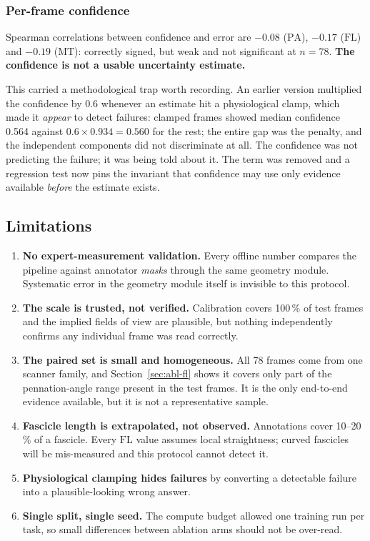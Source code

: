 \documentclass[11pt,a4paper]{article}
\newcommand{\MT}{\ensuremath{\mathrm{MT}}}
\newcommand{\PA}{\ensuremath{\mathrm{PA}}}
\newcommand{\FL}{\ensuremath{\mathrm{FL}}}
\begin{document}
\subsubsection{Per-frame confidence}

Spearman correlations between confidence and error are $-0.08$ (\PA), $-0.17$
(\FL) and $-0.19$ (\MT): correctly signed, but weak and not significant at
$n=78$. \textbf{The confidence is not a usable uncertainty estimate.}

This carried a methodological trap worth recording. An earlier version multiplied
the confidence by 0.6 whenever an estimate hit a physiological clamp, which made
it \emph{appear} to detect failures: clamped frames showed median confidence
0.564 against $0.6\times0.934=0.560$ for the rest; the entire gap was the
penalty, and the independent components did not discriminate at all. The
confidence was not predicting the failure; it was being told about it. The term
was removed and a regression test now pins the invariant that confidence may use
only evidence available \emph{before} the estimate exists.

\subsection{Limitations}

\begin{enumerate}
  \item \textbf{No expert-measurement validation.} Every offline number compares
        the pipeline against annotator \emph{masks} through the same geometry
        module. Systematic error in the geometry module itself is invisible to
        this protocol.
  \item \textbf{The scale is trusted, not verified.} Calibration covers 100\,\%
        of test frames and the implied fields of view are plausible, but nothing
        independently confirms any individual frame was read correctly.
  \item \textbf{The paired set is small and homogeneous.} All 78 frames come from
        one scanner family, and Section~\ref{sec:abl-fl} shows it covers only part
        of the pennation-angle range present in the test frames. It is the only
        end-to-end evidence available, but it is not a representative sample.
  \item \textbf{Fascicle length is extrapolated, not observed.} Annotations cover
        10--20\,\% of a fascicle. Every \FL{} value assumes local straightness;
        curved fascicles will be mis-measured and this protocol cannot detect it.
  \item \textbf{Physiological clamping hides failures} by converting a detectable
        failure into a plausible-looking wrong answer.
  \item \textbf{Single split, single seed.} The compute budget allowed one
        training run per task, so small differences between ablation arms should
        not be over-read.
\end{enumerate}
\end{document}
